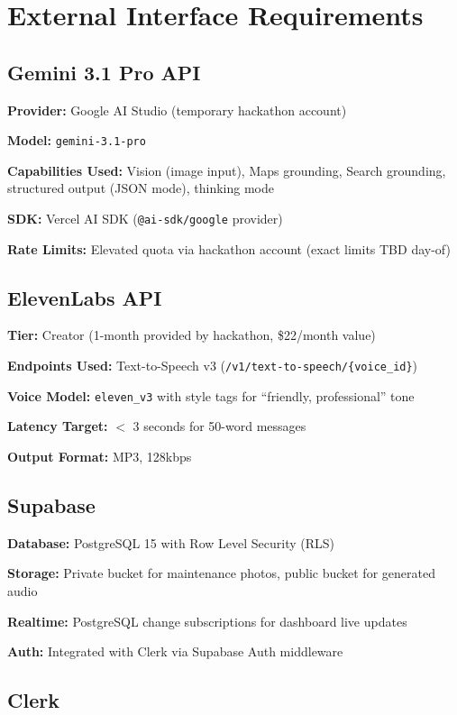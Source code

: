 \documentclass[12pt,a4paper]{article}
\begin{document}
\section{External Interface Requirements}

\subsection{Gemini 3.1 Pro API}

\textbf{Provider:} Google AI Studio (temporary hackathon account)

\textbf{Model:} \texttt{gemini-3.1-pro}

\textbf{Capabilities Used:} Vision (image input), Maps grounding, Search grounding, structured output (JSON mode), thinking mode

\textbf{SDK:} Vercel AI SDK (\texttt{@ai-sdk/google} provider)

\textbf{Rate Limits:} Elevated quota via hackathon account (exact limits TBD day-of)

\subsection{ElevenLabs API}

\textbf{Tier:} Creator (1-month provided by hackathon, \$22/month value)

\textbf{Endpoints Used:} Text-to-Speech v3 (\texttt{/v1/text-to-speech/\{voice\_id\}})

\textbf{Voice Model:} \texttt{eleven\_v3} with style tags for ``friendly, professional'' tone

\textbf{Latency Target:} $<$ 3 seconds for 50-word messages

\textbf{Output Format:} MP3, 128kbps

\subsection{Supabase}

\textbf{Database:} PostgreSQL 15 with Row Level Security (RLS)

\textbf{Storage:} Private bucket for maintenance photos, public bucket for generated audio

\textbf{Realtime:} PostgreSQL change subscriptions for dashboard live updates

\textbf{Auth:} Integrated with Clerk via Supabase Auth middleware

\subsection{Clerk}
\end{document}
